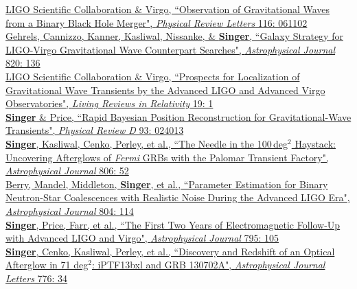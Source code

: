 \documentclass[10pt, letterpaper]{article} %
\newcommand{\years}[1]{\marginnote{\scriptsize #1}} %
\begin{document}
%
\years{2016}\href{https://dx.doi.org/10.1103/PhysRevLett.116.061102}{LIGO Scientific Collaboration \& Virgo, “Observation of Gravitational Waves from a Binary Black Hole Merger", \emph{Physical Review Letters} 116: 061102}\\[0.125cm]
% 
\years{2016}\href{https://dx.doi.org/10.3847/0004-637X/820/2/136}{Gehrels, Cannizzo, Kanner, Kasliwal,  Nissanke, \& \textbf{Singer}, “Galaxy Strategy for LIGO-Virgo Gravitational Wave Counterpart Searches", \emph{Astrophysical Journal} 820: 136}\\[0.125cm]
%
\years{2016}\href{https://dx.doi.org/10.1007/lrr-2016-1}{LIGO Scientific Collaboration \& Virgo, “Prospects for Localization of Gravitational Wave Transients by the Advanced LIGO and Advanced Virgo Observatories", \emph{Living Reviews in Relativity} 19: 1}\\[0.125cm]
%
\years{2016}\href{https://dx.doi.org/10.1103/PhysRevD.93.024013}{\textbf{Singer} \& Price, “Rapid Bayesian Position Reconstruction for Gravitational-Wave Transients", \emph{Physical Review D} 93: 024013}\\[0.125cm]
%
%
\years{2015}\href{https://dx.doi.org/10.1088/0004-637X/806/1/52}{\textbf{Singer}, Kasliwal, Cenko, Perley, et al., “The Needle in the 100\,deg$^2$ Haystack: Uncovering Afterglows of \emph{Fermi} GRBs with the Palomar Transient Factory", \emph{Astrophysical Journal} 806: 52}\\[0.125cm]
%
\years{2015}\href{https://dx.doi.org/10.1088/0004-637X/804/2/114}{Berry, Mandel, Middleton, \textbf{Singer}, et al., “Parameter Estimation for Binary Neutron-Star Coalescences with Realistic Noise During the Advanced LIGO Era", \emph{Astrophysical Journal} 804: 114}\\[0.125cm]
%
\years{2014}\href{https://dx.doi.org/10.1088/0004-637X/795/2/105}{\textbf{Singer}, Price, Farr, et al., “The First Two Years of Electromagnetic Follow-Up with Advanced LIGO and Virgo", \emph{Astrophysical Journal} 795: 105}\\[0.125cm]
%
\years{2013}\href{https://dx.doi.org/10.1088/2041-8205/776/2/L34}{\textbf{Singer}, Cenko, Kasliwal, Perley, et al., “Discovery and Redshift of an Optical Afterglow in 71 deg$^2$: iPTF13bxl and GRB 130702A", \emph{Astrophysical Journal Letters} 776: 34}\\[0.125cm]
\end{document}
